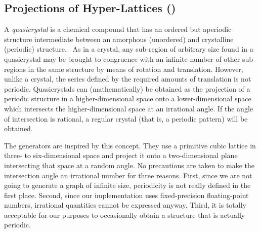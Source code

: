 \documentclass{graphstudy}
\begin{document}
\begin{Figure}
  \begin{center}
  \end{center}
  \caption[Examples of two  graphs]{%
    Examples of two graphs produced by the  generator (native layouts).
  }
  \label{fig:lindenmayer}
\end{Figure}

\subsection{Projections of Hyper-Lattices (\QuasiNd)}
\label{sec:quasi}

A \emph{quasicrystal} is a chemical compound that has an ordered but aperiodic structure intermediate between an
amorphous (unordered) and crystalline (periodic) structure.~\cite{WikiQuasicrystal}
As in a crystal, any sub-region of arbitrary size found in a quasicrystal may be brought to congruence with an infinite
number of other sub-regions in the same structure by means of rotation and translation.  However, unlike a crystal, the
series defined by the required amounts of translation is not periodic.  Quasicrystals can (mathematically) be obtained
as the projection of a periodic structure in a higher-dimensional space onto a lower-dimensional space which intersects
the higher-dimensional space at an irrational angle.  If the angle of intersection is rational, a regular crystal (that
is, a periodic pattern) will be obtained.

The \QuasiNd{} generators are inspired by this concept.  They use a primitive cubic lattice in three- to six-dimensional
space and project it onto a two-dimensional plane intersecting that space at a random angle.  No precautions are taken
to make the intersection angle an irrational number for three reasons.  First, since we are not going to generate a
graph of infinite size, periodicity is not really defined in the first place.  Second, since our implementation uses
fixed-precision floating-point numbers, irrational quantities cannot be expressed anyway.  Third, it is totally
acceptable for our purposes to occasionally obtain a structure that is actually periodic.
\end{document}
